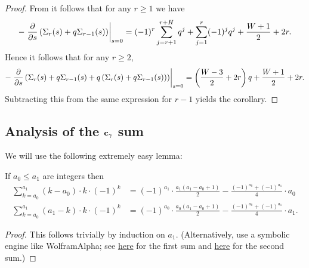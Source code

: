 \begin{proof}
  From  it follows that for any $r \ge 1$ we have
  \[ -\left. \pdv{}{s} \left( \Sigma_r(s) + q \Sigma_{r-1}(s) \right) \right\rvert_{s=0}
    = (-1)^r \sum_{j=r+1}^{r+H} q^j + \sum_{j=1}^r (-1)^j q^j + \frac{W+1}{2} + 2r. \]
  Hence it follows that for any $r \ge 2$,
  \[ -\left. \pdv{}{s} \left(
      \Sigma_r(s) + q \Sigma_{r-1}(s)
      + q \left( \Sigma_r(s) + q \Sigma_{r-1}(s) \right) \right) \right\rvert_{s=0}
    = \left( \frac{W-3}{2}+2r \right) q + \frac{W+1}{2}+2r.
  \]
  Subtracting this from the same expression for $r-1$ yields the corollary.
\end{proof}

\subsection{Analysis of the $\mathbf c_\gamma$ sum}
We will use the following extremely easy lemma:
\begin{lemma}
  \label{lem:extremely_easy_lemma}
  If $a_0 \le a_1$ are integers then
  \begin{align*}
    \sum_{k=a_0}^{a_1} (k-a_0) \cdot k \cdot (-1)^k
    &= (-1)^{a_1} \cdot \frac{a_1(a_1-a_0+1)}{2} - \frac{(-1)^{a_0} + (-1)^{a_1}}{4} \cdot a_0 \\
    \sum_{k=a_0}^{a_1} (a_1-k) \cdot k \cdot (-1)^k
    &= (-1)^{a_0} \cdot \frac{a_0(a_1-a_0+1)}{2} - \frac{(-1)^{a_0} + (-1)^{a_1}}{4} \cdot a_1.
  \end{align*}
\end{lemma}
\begin{proof}
  This follows trivially by induction on $a_1$.
  (Alternatively, use a symbolic engine like WolframAlpha;
  see
  \href{https://www.wolframalpha.com/input?i=sum+\%28k-a\%29*k*\%28-1\%29\%5Ek+from+k\%3Da+to+b}{here}
  for the first sum and
  \href{https://www.wolframalpha.com/input?i=sum+\%28b-k\%29*k*\%28-1\%29\%5Ek+from+k\%3Da+to+b}{here}
  for the second sum.)
\end{proof}

